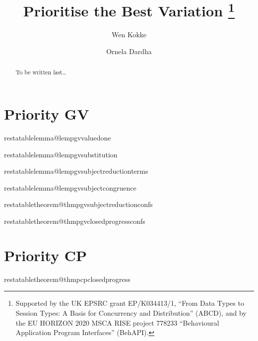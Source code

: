 \documentclass[citecolor=red,linkcolor=blue,runningheads]{llncs}
\makeatletter
\newcommand{\onlyinsubfile}[1]{#1}
\newcommand{\notinsubfile}[1]{}
\newcommand{\restatetheorem}[1]{%
  \begingroup
  \renewcommand{\thetheorem}{\ref{#1}}%
  \expandafter\expandafter\expandafter\theorem
  \csname restatabletheorem@#1\endcsname
  \endtheorem
  \endgroup
}
\newcommand{\restatelemma}[1]{%
  \begingroup
  \renewcommand{\thelemma}{\ref{#1}}%
  \expandafter\expandafter\expandafter\lemma
  \csname restatablelemma@#1\endcsname
  \endlemma
  \endgroup
}
\makeatother
\begin{document}
%
\renewcommand{\onlyinsubfile}[1]{}
\renewcommand{\notinsubfile}[1]{#1}
%
\title{Prioritise the Best Variation%
  \thanks{Supported by the UK EPSRC grant EP/K034413/1, ``From Data Types to Session Types: A Basis for Concurrency and Distribution'' (ABCD), and by the EU
  HORIZON 2020 MSCA RISE project 778233 ``Behavioural Application Program Interfaces'' (BehAPI).}
}
%
\author{
  Wen Kokke%
  \and%
  Ornela Dardha%
  }
%
%
%
\maketitle
%
\begin{abstract}
To be written last\dots
{}
\end{abstract}










\clearpage
\appendix
\changetext{}{10em}{-5em}{-5em}{}

\appendix
\section{Priority GV}
{

  

  \restatelemma{lempgvvaluedone}
  

  \restatelemma{lempgvsubstitution}
  

  \restatelemma{lempgvsubjectreductionterms}
  

  \restatelemma{lempgvsubjectcongruence}
  

  \restatetheorem{thmpgvsubjectreductionconfs}
  

  \restatetheorem{thmpgvclosedprogressconfs}
  
}
\section{Priority CP}
{

  

  \restatetheorem{thmpcpclosedprogress}
  
}
\end{document}
